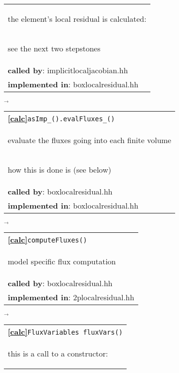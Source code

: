 \begin{landscape}
{\begin{tabular}{|l|}
    \begin{scriptsize}the element's local residual is calculated:\end{scriptsize}\\
    \begin{scriptsize}see the next two stepstones\end{scriptsize}\\
      \textbf{called by}: implicitlocaljacobian.hh\\
      \textbf{implemented in}: boxlocalresidual.hh\\
     \hline
  \end{tabular}
    $\overrightarrow{
    }$
    \begin{tabular}{|l|}
      \hline
    \textbf{\textcircled{\ref{calc}}}\verb+asImp_().evalFluxes_()+ \\
    \begin{scriptsize}evaluate the fluxes going into each finite volume\end{scriptsize}\\
    \begin{scriptsize}how this is done is \fbox{\fbox{model specific}} (see below)\end{scriptsize}\\
      \textbf{called by}: boxlocalresidual.hh\\
      \textbf{implemented in}: boxlocalresidual.hh\\
     \hline
  \end{tabular}
\nextline
{$\overrightarrow{}$}
     \begin{tabular}{||l||}
        \hline\hline
        \textbf{\textcircled{\ref{calc}}}\verb+computeFluxes()+ \\
        \begin{scriptsize}model specific flux computation  \end{scriptsize}\\
        \textbf{called by}: boxlocalresidual.hh\\
        \textbf{implemented in}: 2plocalresidual.hh\\
        \hline\hline
     \end{tabular}
    $\overrightarrow{
    }$
     \begin{tabular}{||l||}
        \hline\hline
        \textbf{\textcircled{\ref{calc}}}\verb+FluxVariables fluxVars()+ \\
        \begin{scriptsize}this is a call to a constructor:  \end{scriptsize}\\

\end{tabular}}
\end{landscape}
